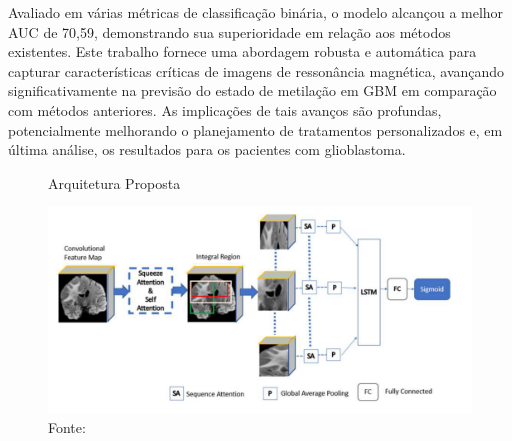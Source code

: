 Avaliado em várias métricas de classificação binária, o modelo alcançou a melhor \gls{AUC} de 70,59, demonstrando sua superioridade em relação aos métodos existentes. Este trabalho fornece uma abordagem robusta e automática para capturar características críticas de imagens de ressonância magnética, avançando significativamente na previsão do estado de metilação em \gls{GBM} em comparação com métodos anteriores. As implicações de tais avanços são profundas, potencialmente melhorando o planejamento de tratamentos personalizados e, em última análise, os resultados para os pacientes com glioblastoma.

\begin{figure}[htbp]
    \centering
    \caption{Arquitetura Proposta}
    \includegraphics[width=1\textwidth]{figures/fig010.png}
    \caption*{Fonte: \cite{iranmehrImprovedPredictionMGMT2022}}
    \label{fig:fig010}
\end{figure}

